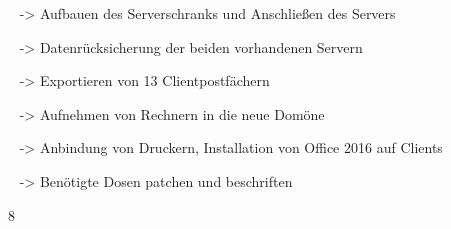 {{	\textbullet~ -> Aufbauen des Serverschranks und Anschließen des Servers\par
	\textbullet~ -> Datenrücksicherung der beiden vorhandenen Servern\par
	\textbullet~ -> Exportieren von 13 Clientpostfächern\par
	\textbullet~ -> Aufnehmen von Rechnern in die neue Domöne\par
	\textbullet~ -> Anbindung von Druckern, Installation von Office 2016 auf Clients\par
	\textbullet~ -> Benötigte Dosen patchen und beschriften
	}{}{8}
}{}
\Unterschrift
\newpage
